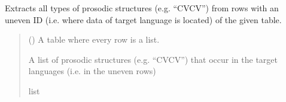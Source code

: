 \documentclass[letterpaper,10pt,english]{sphinxmanual}
\begin{document}

\begin{fulllineitems}
\label{\detokenize{documentation:loanpy.scminer.get_prosodic_inventory}}
\pysigstartsignatures
{}
\pysigstopsignatures
\sphinxAtStartPar
Extracts all types of prosodic structures (e.g. “CVCV”)
from rows with an uneven ID (i.e. where data of target language is
located) of the given table.
\begin{quote}\begin{description}
\sphinxAtStartPar
{} () \textendash{} A table where every row is a list.

\sphinxAtStartPar
A list of prosodic structures (e.g. “CVCV”) that occur in the
target languages (i.e. in the uneven rows)

\sphinxAtStartPar
list

\end{description}\end{quote}

\sphinxAtStartPar
{}


\end{fulllineitems}
\end{document}
